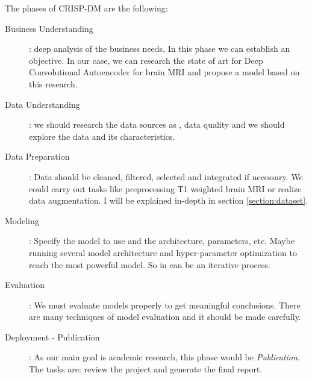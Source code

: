 The phases of CRISP-DM \cite{crisp} are the following:
\begin{description}
    \item[Business Understanding]: deep analysis of the business needs. In this phase we can establish an objective. In our case, we can research the state of art for Deep Convolutional Autoencoder for brain MRI and propose a model based on this research.
    \item[Data Understanding]: we should research the data sources as  , data quality and we should explore the data and its characteristics.
    \item[Data Preparation]: Data should be cleaned, filtered, selected and integrated if necessary. We could carry out tasks like preprocessing T1 weighted brain MRI or realize data augmentation. I will be explained in-depth in section \ref{section:dataset}.
    \item[Modeling]: Specify the model to use and the architecture, parameters, etc. Maybe running several model architecture and hyper-parameter optimization to reach the most powerful model. So in can be an iterative process.
    \item[Evaluation]: We must evaluate models properly to get meaningful conclusions. There are many techniques of model evaluation and it should be made carefully.
    \item[Deployment - Publication]: As our main goal is academic research, this phase would be \textit{Publication}. The tasks are: review the project and generate the final report.
\end{description}